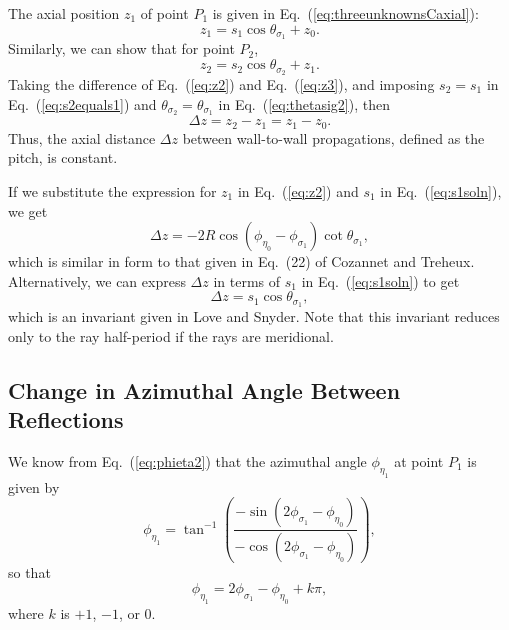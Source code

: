 \documentclass[a4paper,twocolumn,superscriptaddress]{revtex4-1}
\begin{document}
{The axial position $z_1$ of point $P_1$ is given 
in Eq.~(\ref{eq:threeunknownsCaxial}):
\begin{equation}
\label{eq:z2}
z_1
=
s_1 \cos \theta_{ \sigma_1 } + z_0 .
\end{equation}
Similarly, we can show that for point $P_2$,
\begin{equation}
\label{eq:z3}
    z_2
=
    s_2 \cos \theta_{ \sigma_2 }
    + z_1 .
\end{equation}
Taking the difference of Eq.~(\ref{eq:z2}) and Eq.~(\ref{eq:z3}), and imposing $s_2=s_1$ in Eq.~(\ref{eq:s2equals1}) and $\theta_{ \sigma_2 } = \theta_{ \sigma_1 } $ in Eq.~(\ref{eq:thetasig2}), then
\begin{equation}
\label{eq:deltaz}
\Delta z =
    z_2 - z_1
 = z_1-z_0 .
\end{equation}
Thus, the axial distance $\Delta z$ between wall-to-wall propagations, defined as the pitch, is constant.

If we substitute the expression for $z_1$ in Eq.~(\ref{eq:z2}) and $s_1$ in Eq.~(\ref{eq:s1soln}), we get
\begin{equation}
\Delta z = 
  - 2 R \cos(\phi_{ \eta_0 }-\phi_{ \sigma_1 }) \cot \theta_{ \sigma_1 } ,
\end{equation}
which is similar in form to that given in Eq.~(22) of Cozannet and Treheux\cite{Cozannet}.
Alternatively, we can express $\Delta z$ in terms of $s_1$ in Eq.~(\ref{eq:s1soln}) to get
\begin{equation}
\Delta z =
    s_1 \cos \theta_{ \sigma_1 } ,
\end{equation}
which is an invariant given in Love and Snyder\cite{lovesnyder}. Note that this invariant reduces only to the ray half-period if the rays are meridional.

\subsection{Change in Azimuthal Angle Between Reflections}

We know from Eq.~(\ref{eq:phieta2}) that the azimuthal angle $\phi_{ \eta_1 }$ at point $P_1$ is given by
\begin{equation}
\phi_{ \eta_1 } = \tan^{-1} \left( \dfrac{- \sin ( 2\phi_{ \sigma_1 } - \phi_{ \eta_0 }) }{ - \cos ( 2\phi_{ \sigma_1 } - \phi_{ \eta_0 })} \right ) ,
\end{equation}
so that
\begin{equation}
\label{eq:phieta2k}
\phi_{ \eta_1 } = 2\phi_{ \sigma_1 } - \phi_{ \eta_0 } + k \pi ,
\end{equation}
where $k$ is $+1$, $-1$, or $0$.

}
\end{document}
